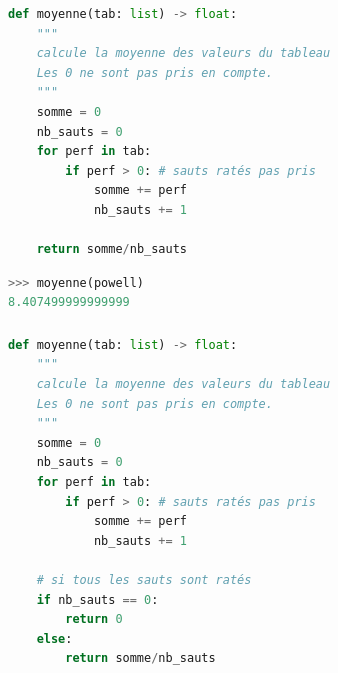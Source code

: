 \documentclass[svgnames,11pt]{beamer}
\begin{document}
\begin{frame}[fragile]

    \begin{lstlisting}[language=Python , basicstyle=\ttfamily\small, xleftmargin=2em, xrightmargin=2em]
def moyenne(tab: list) -> float:
    """
    calcule la moyenne des valeurs du tableau
    Les 0 ne sont pas pris en compte.
    """
    somme = 0
    nb_sauts = 0
    for perf in tab:
        if perf > 0: # sauts ratés pas pris
            somme += perf
            nb_sauts += 1

    return somme/nb_sauts
\end{lstlisting}
    \begin{center}
        \begin{lstlisting}[language=Python , basicstyle=\ttfamily\small, xleftmargin=2em, xrightmargin=2em]
>>> moyenne(powell)
8.407499999999999
\end{lstlisting}
        \label{CODE}
    \end{center}
\end{frame}
\begin{frame}[fragile]
    \frametitle{}
    \begin{center}
        \begin{lstlisting}[language=Python , basicstyle=\ttfamily\small, xleftmargin=2em, xrightmargin=2em]
def moyenne(tab: list) -> float:
    """
    calcule la moyenne des valeurs du tableau
    Les 0 ne sont pas pris en compte.
    """
    somme = 0
    nb_sauts = 0
    for perf in tab:
        if perf > 0: # sauts ratés pas pris
            somme += perf
            nb_sauts += 1
    
    # si tous les sauts sont ratés
    if nb_sauts == 0:
        return 0
    else:
        return somme/nb_sauts
\end{lstlisting}
        \label{CODE}
    \end{center}

\end{frame}
\end{document}
